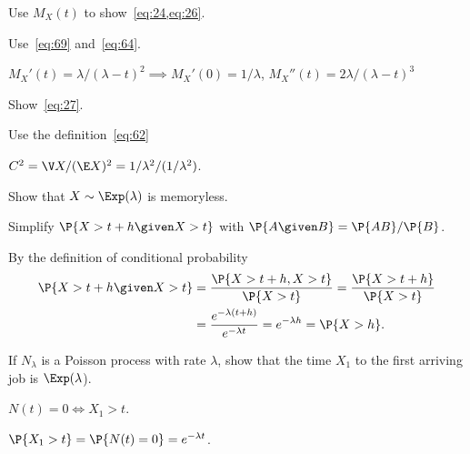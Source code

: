 \begin{exercise}\label{ex:21}
Use $M_X(t)$ to show~\cref{eq:24,eq:26}.
\begin{hint}
Use~\cref{eq:69} and~\cref{eq:64}.
\end{hint}
\begin{solution}
 $ M_X'(t)=\lambda/(\lambda-t)^2 \implies M_X'(0)=1/\lambda$, $M_X''(t)=2\lambda/(\lambda-t)^3$ %
\end{solution}
\end{exercise}


\begin{exercise}\label{ex:29}
Show~\cref{eq:27}.
\begin{hint}
 Use the definition~\cref{eq:62}
\end{hint}
\begin{solution}
 $C^2= \V X/(\E X)^2 = 1/\lambda^2/(1/\lambda^2)$.
\end{solution}
\end{exercise}

\begin{exercise}\label{ex:l-214}
 Show that $X\sim \Exp(\lambda)$ is memoryless.
\begin{hint}
Simplify $\P{X>t+h\given X>t}$ with $\P{A\given B} = \P{AB}/\P{B}$.
\end{hint}
\begin{solution}
By the definition of conditional probability
\begin{equation*}
  \begin{split}
 \P{X>t+h\given X>t} &= \frac{\P{X>t+h, X>t}}{\P{X>t}} = \frac{\P{X>t+h}}{\P{X>t}} \\
&= \frac{e^{-\lambda(t+h)}}{e^{-\lambda t}} = e^{-\lambda h} = \P{X>h}.
  \end{split}
\end{equation*}
\end{solution}
\end{exercise}

\begin{exercise}\label{ex:l-212}
 If  $N_\lambda$ is a Poisson process with rate $\lambda$, show that the time $X_1$ to the first arriving job is $\Exp(\lambda$).
\begin{hint}
$N(t)= 0 \iff X_1 > t$.
\end{hint}
\begin{solution}
$\P{X_1> t} = \P{N(t) = 0} = e^{-\lambda t}$.
\end{solution}
\end{exercise}


